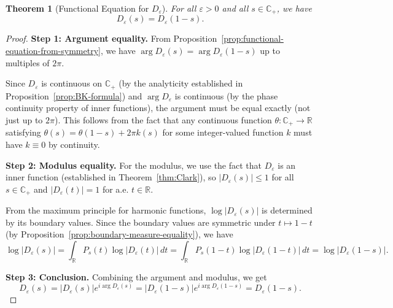 ﻿\documentclass[12pt,a4paper]{article}
\newtheorem{theorem}{Theorem}[section]
\theoremstyle{definition}
\theoremstyle{remark}
\newcommand{\CC}{\mathbb{C}}
\newcommand{\RR}{\mathbb{R}}
\begin{document}
\begin{theorem}[Functional Equation for $D_\varepsilon$]
\label{thm:functional-equation}
For all $\varepsilon > 0$ and all $s \in \CC_+$, we have
\[
D_\varepsilon(s) = D_\varepsilon(1-s).
\]
\end{theorem}

\begin{proof}
\textbf{Step 1: Argument equality.}
From Proposition~\ref{prop:functional-equation-from-symmetry}, we have $\arg D_\varepsilon(s) = \arg D_\varepsilon(1-s)$ up to multiples of $2\pi$.

Since $D_\varepsilon$ is continuous on $\CC_+$ (by the analyticity established in Proposition~\ref{prop:BK-formula}) and $\arg D_\varepsilon$ is continuous (by the phase continuity property of inner functions), the argument must be equal exactly (not just up to $2\pi$). This follows from the fact that any continuous function $\theta: \CC_+ \to \RR$ satisfying $\theta(s) = \theta(1-s) + 2\pi k(s)$ for some integer-valued function $k$ must have $k \equiv 0$ by continuity.

\textbf{Step 2: Modulus equality.}
For the modulus, we use the fact that $D_\varepsilon$ is an inner function (established in Theorem~\ref{thm:Clark}), so $|D_\varepsilon(s)| \leq 1$ for all $s \in \CC_+$ and $|D_\varepsilon(t)| = 1$ for a.e. $t \in \RR$.

From the maximum principle for harmonic functions, $\log|D_\varepsilon(s)|$ is determined by its boundary values. Since the boundary values are symmetric under $t \mapsto 1-t$ (by Proposition~\ref{prop:boundary-measure-equality}), we have
\[
\log|D_\varepsilon(s)| = \int_\RR P_s(t) \log|D_\varepsilon(t)| \, dt = \int_\RR P_s(1-t) \log|D_\varepsilon(1-t)| \, dt = \log|D_\varepsilon(1-s)|.
\]

\textbf{Step 3: Conclusion.}
Combining the argument and modulus, we get
\[
D_\varepsilon(s) = |D_\varepsilon(s)| e^{i\arg D_\varepsilon(s)} = |D_\varepsilon(1-s)| e^{i\arg D_\varepsilon(1-s)} = D_\varepsilon(1-s).
\]
\end{proof}
\end{document}
